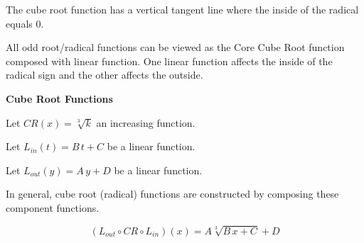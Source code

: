 \documentclass{ximera}
\begin{document}
The cube root function has a vertical tangent line where the inside of the radical equals $0$.






































All odd root/radical functions can be viewed as the Core Cube Root function composed with linear function. One linear function affects the inside of the radical sign and the other affects the outside.


\begin{idea} \textbf{\textcolor{blue!55!black}{Cube Root Functions}} 


Let $CR(x) = \sqrt[3]{k}$ an increasing function.

Let $L_{in}(t) = B \, t + C$ be a linear function.

Let $L_{out}(y) = A \, y + D$ be a linear function.


In general, cube root (radical) functions are constructed by composing these component functions.


\[
(L_{out} \circ CR \circ L_{in})(x) = A \sqrt[3]{B \,x + C} + D
\]


\end{idea}
\end{document}
